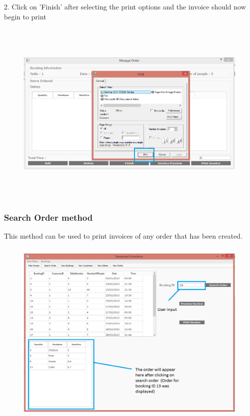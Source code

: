 2. Click on 'Finish' after selecting the print options and the invoice should now begin to print
 
\begin{figure}[H]
    \includegraphics[height = 9cm]{./Manual/images/PrintInvoice2} 
    \caption{} \label{fig:printinvoice2}
\end{figure}

\subsubsection{Search Order method}
This method can be used to print invoices of any order that has been created.

\begin{figure}[H]
    \includegraphics[height = 9cm]{./Manual/images/PrintInvoice3} 
    \caption{} \label{fig:printinvoice3}
\end{figure}

